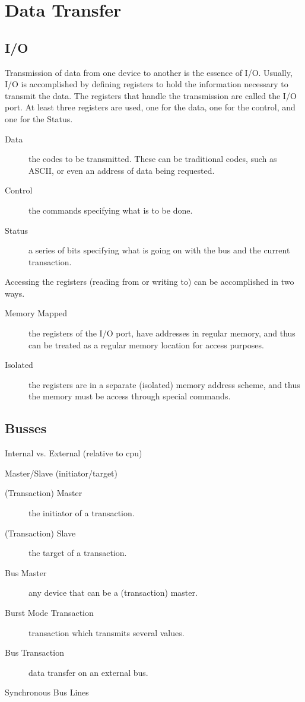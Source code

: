 \chapter{Data Transfer}
\label{c-comps}


\section{I/O}

Transmission of data from one device to another is the essence of
I/O.  Usually, I/O is accomplished by defining registers to hold
the information necessary to transmit the data.  The registers
that handle the transmission are called the I/O port. At least
three registers are used, one for the data, one for the control,
and one for the Status.
\begin{description}
  \item[Data] the codes to be transmitted.  These can be
  traditional codes, such as ASCII, or even an address of data
  being requested.
  \item[Control] the commands specifying what is to be done.
  \item[Status] a series of bits specifying what is going on with
  the bus and the current transaction.
\end{description}
Accessing the registers (reading from or writing to) can be
accomplished in two ways.
\begin{description}
  \item[Memory Mapped] the registers of the I/O port, have
  addresses in regular memory, and thus can be treated as a
  regular memory location for access purposes.
  \item[Isolated] the registers are in a separate (isolated)
  memory address scheme, and thus the memory must be access
  through special commands.
\end{description}


\section{Busses} \label{s-busses}

Internal vs. External (relative to cpu)

Master/Slave (initiator/target)

\begin{description}
  \item[(Transaction) Master] the initiator of a transaction.
  \item[(Transaction) Slave] the target of a transaction.
  \item[Bus Master] any device that can be a (transaction) master.
  \item[Burst Mode Transaction] transaction which transmits several
  values.
  \item[Bus Transaction] data transfer on an external bus.
\end{description}
Synchronous Bus Lines

